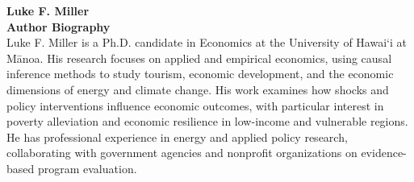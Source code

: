 \documentclass[12pt]{article}
\begin{document}
\noindent


\noindent
\textbf{Luke F. Miller} \\

\medskip
\noindent
\textbf{Author Biography} \\
Luke F. Miller is a Ph.D. candidate in Economics at the University of Hawai‘i at Mānoa. His research focuses on applied and empirical economics, using causal inference methods to study tourism, economic development, and the economic dimensions of energy and climate change. His work examines how shocks and policy interventions influence economic outcomes, with particular interest in poverty alleviation and economic resilience in low-income and vulnerable regions. He has professional experience in energy and applied policy research, collaborating with government agencies and nonprofit organizations on evidence-based program evaluation.
\end{document}

